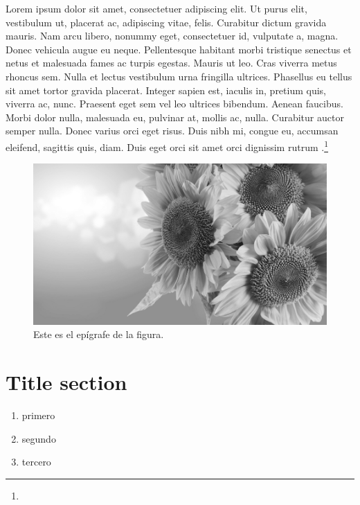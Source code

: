 \documentclass{book}
\begin{document}
Lorem ipsum dolor sit amet, consectetuer adipiscing elit. Ut purus elit, vestibulum ut, placerat ac, adipiscing vitae, felis. Curabitur dictum gravida mauris. Nam arcu libero, nonummy eget, consectetuer id, vulputate a, magna. Donec vehicula augue eu neque. Pellentesque habitant morbi tristique senectus et netus et malesuada fames ac turpis egestas. Mauris ut leo. Cras viverra metus rhoncus sem. Nulla et lectus vestibulum urna fringilla ultrices. Phasellus eu tellus sit amet tortor gravida placerat. Integer sapien est, iaculis in, pretium quis, viverra ac, nunc. Praesent eget sem vel leo ultrices bibendum. Aenean faucibus. Morbi dolor nulla, malesuada eu, pulvinar at, mollis ac, nulla. Curabitur auctor semper nulla. Donec varius orci eget risus. Duis nibh mi, congue eu, accumsan eleifend, sagittis quis, diam. Duis eget orci sit amet orci dignissim rutrum \parencite{@3070-TARKOVSKI1995}.\footnote{\lipsum[3]}

\lipsum[1]

\begin{figure}[!ht]
	\centering
	\includegraphics[width=\linewidth]{./media/bn-imagen1.png}
	\caption{Este es el epígrafe de la figura.}\label{figura1}
\end{figure}

\section{Title section}

\begin{enumerate}
	\item primero
	\item segundo
	\item tercero
\end{enumerate}

\lipsum[3]
\end{document}
